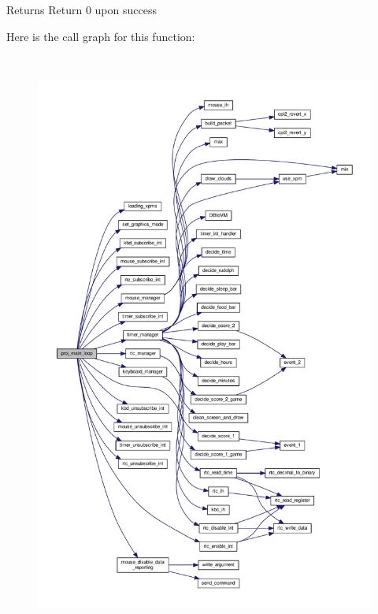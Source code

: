 \begin{DoxyReturn}{Returns}
Return 0 upon success 
\end{DoxyReturn}
Here is the call graph for this function\+:
\nopagebreak
\begin{figure}[H]
\begin{center}
\leavevmode
\includegraphics[height=550pt]{group__main__loop_ga2a16f651eccbd248e1ad3b3b924b143b_cgraph}
\end{center}
\end{figure}
